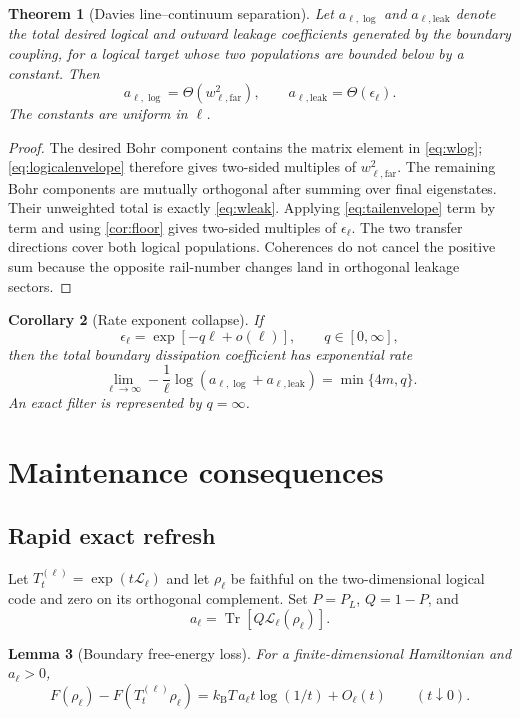 \documentclass[11pt,a4paper]{article}
\newtheorem{theorem}{Theorem}[section]
\newtheorem{lemma}[theorem]{Lemma}
\newtheorem{corollary}[theorem]{Corollary}
\theoremstyle{remark}
\newcommand{\cL}{\mathcal L}
\DeclareMathOperator{\Tr}{Tr}
\begin{document}
\begin{theorem}[Davies line--continuum separation]\label{thm:daviesweights}
Let $a_{\ell,\log}$ and $a_{\ell,\mathrm{leak}}$ denote the total desired logical and outward leakage coefficients generated by the boundary coupling, for a logical target whose two populations are bounded below by a constant.  Then
\[
 a_{\ell,\log}=\Theta(w_{\ell,\mathrm{far}}^2),
 \qquad
 a_{\ell,\mathrm{leak}}=\Theta(\epsilon_\ell).
\]
The constants are uniform in $\ell$.
\end{theorem}

\begin{proof}
The desired Bohr component contains the matrix element in \cref{eq:wlog}; \cref{eq:logicalenvelope} therefore gives two-sided multiples of $w_{\ell,\mathrm{far}}^2$.  The remaining Bohr components are mutually orthogonal after summing over final eigenstates.  Their unweighted total is exactly \cref{eq:wleak}.  Applying \cref{eq:tailenvelope} term by term and using \cref{cor:floor} gives two-sided multiples of $\epsilon_\ell$.  The two transfer directions cover both logical populations.  Coherences do not cancel the positive sum because the opposite rail-number changes land in orthogonal leakage sectors.
\end{proof}

\begin{corollary}[Rate exponent collapse]\label{cor:rateexponent}
If
\[
 \epsilon_\ell=\exp[-q\ell+o(\ell)],\qquad q\in[0,\infty],
\]
then the total boundary dissipation coefficient has exponential rate
\[
 \lim_{\ell\to\infty}-\frac1\ell
 \log(a_{\ell,\log}+a_{\ell,\mathrm{leak}})
 =\min\{4m,q\}.
\]
An exact filter is represented by $q=\infty$.
\end{corollary}

\section{Maintenance consequences}

\subsection{Rapid exact refresh}

Let $T_t^{(\ell)}=\exp(t\cL_\ell)$ and let $\rho_\ell$ be faithful on the two-dimensional logical code and zero on its orthogonal complement.  Set $P=P_L$, $Q=1-P$, and
\[
 a_\ell=\Tr[Q\cL_\ell(\rho_\ell)].
\]

\begin{lemma}[Boundary free-energy loss]\label{lem:boundaryF}
For a finite-dimensional Hamiltonian and $a_\ell>0$,
\[
 F(\rho_\ell)-F(T_t^{(\ell)}\rho_\ell)
 =k_{\mathrm B}T\,a_\ell t\log(1/t)+O_\ell(t)
 \qquad(t\downarrow0).
\]
\end{lemma}
\end{document}
